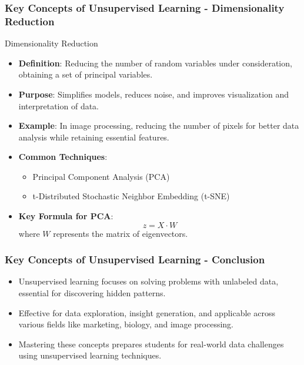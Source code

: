\documentclass[aspectratio=169]{beamer}
\begin{document}
\begin{frame}[fragile]
    \frametitle{Key Concepts of Unsupervised Learning - Dimensionality Reduction}
    \begin{block}{Dimensionality Reduction}
        \begin{itemize}
            \item \textbf{Definition}: Reducing the number of random variables under consideration, obtaining a set of principal variables.
            \item \textbf{Purpose}: Simplifies models, reduces noise, and improves visualization and interpretation of data.
            \item \textbf{Example}: In image processing, reducing the number of pixels for better data analysis while retaining essential features.
            \item \textbf{Common Techniques}:
                \begin{itemize}
                    \item Principal Component Analysis (PCA)
                    \item t-Distributed Stochastic Neighbor Embedding (t-SNE)
                \end{itemize}
            \item \textbf{Key Formula for PCA}:
                \begin{equation}
                    z = X \cdot W
                \end{equation}
                where \( W \) represents the matrix of eigenvectors.
        \end{itemize}
    \end{block}
\end{frame}

\begin{frame}[fragile]
    \frametitle{Key Concepts of Unsupervised Learning - Conclusion}
    \begin{itemize}
        \item Unsupervised learning focuses on solving problems with unlabeled data, essential for discovering hidden patterns.
        \item Effective for data exploration, insight generation, and applicable across various fields like marketing, biology, and image processing.
        \item Mastering these concepts prepares students for real-world data challenges using unsupervised learning techniques.
    \end{itemize}
\end{frame}
\end{document}
